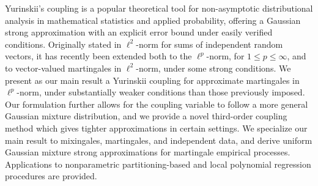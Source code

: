 Yurinskii's coupling is a popular theoretical tool for non-asymptotic
distributional analysis in mathematical statistics and applied probability,
offering a Gaussian strong approximation with an explicit error bound under
easily verified conditions.
Originally stated in $\ell^2$-norm for sums of independent random vectors, it
has recently been extended both to the $\ell^p$-norm,
for $1 \leq p \leq \infty$, and to vector-valued martingales in
$\ell^2$-norm, under some strong conditions.
We present as our main result a Yurinskii coupling for approximate
martingales in $\ell^p$-norm, under substantially weaker conditions than
those previously imposed. Our formulation further allows for the coupling
variable to follow a more general Gaussian mixture distribution, and we
provide a novel third-order coupling method which gives tighter
approximations in certain settings.
We specialize our main result to mixingales, martingales, and independent
data, and derive uniform Gaussian mixture strong approximations for
martingale empirical processes. Applications to nonparametric
partitioning-based and local polynomial regression procedures are provided.
